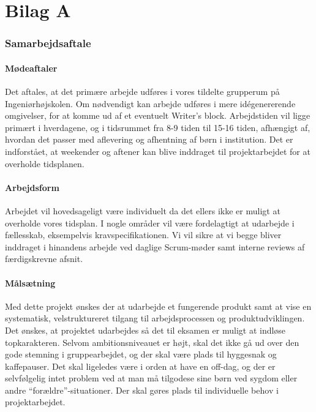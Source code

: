 \newpage
\appendix
\chapter{Bilag A}



\subsection{Samarbejdsaftale}
\label{App:samarbejdsaftale}

\subsubsection{Mødeaftaler}
Det aftales, at det primære arbejde udføres i vores tildelte grupperum på Ingeniørhøjskolen. Om nødvendigt kan arbejde udføres i mere idégenererende omgivelser, for at komme ud af et eventuelt Writer’s block. Arbejdstiden vil ligge primært i hverdagene, og i tidsrummet fra 8-9 tiden til 15-16 tiden, afhængigt af, hvordan det passer med aflevering og afhentning af børn i institution. Det er indforstået, at weekender og aftener kan blive inddraget til projektarbejdet for at overholde tidsplanen.

\subsubsection{Arbejdsform}
Arbejdet vil hovedsageligt være individuelt da det ellers ikke er muligt at overholde vores tidsplan. I nogle områder vil være fordelagtigt at udarbejde i fællesskab, eksempelvis kravspecifikationen. Vi vil sikre at vi begge bliver inddraget i hinandens arbejde ved daglige Scrum-møder samt interne reviews af færdigskrevne afsnit. 

\subsubsection{Målsætning}  
Med dette projekt ønskes der at udarbejde et fungerende produkt samt at vise en systematisk, velstruktureret tilgang til arbejdsprocessen og produktudviklingen. Det ønskes, at projektet udarbejdes så det til eksamen er muligt at indløse topkarakteren. 
Selvom ambitionsniveauet er højt, skal det ikke gå ud over den gode stemning i gruppearbejdet, og der skal være plads til hyggesnak og kaffepauser. Det skal ligeledes være i orden at have en off-dag, og der er selvfølgelig intet problem ved at man må tilgodese sine børn ved sygdom eller andre “forældre”-situationer. Der skal gøres plads til individuelle behov i projektarbejdet.

